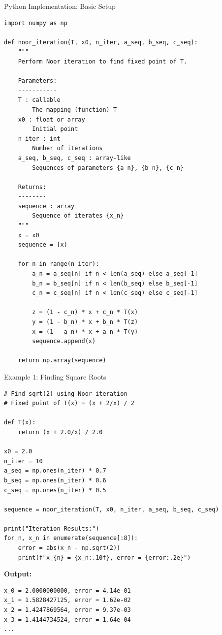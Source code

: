\documentclass[aspectratio=169,10pt]{beamer}
\begin{document}
\begin{frame}[fragile]{Python Implementation: Basic Setup}

\begin{lstlisting}
import numpy as np

def noor_iteration(T, x0, n_iter, a_seq, b_seq, c_seq):
    """
    Perform Noor iteration to find fixed point of T.

    Parameters:
    -----------
    T : callable
        The mapping (function) T
    x0 : float or array
        Initial point
    n_iter : int
        Number of iterations
    a_seq, b_seq, c_seq : array-like
        Sequences of parameters {a_n}, {b_n}, {c_n}

    Returns:
    --------
    sequence : array
        Sequence of iterates {x_n}
    """
    x = x0
    sequence = [x]

    for n in range(n_iter):
        a_n = a_seq[n] if n < len(a_seq) else a_seq[-1]
        b_n = b_seq[n] if n < len(b_seq) else b_seq[-1]
        c_n = c_seq[n] if n < len(c_seq) else c_seq[-1]

        z = (1 - c_n) * x + c_n * T(x)
        y = (1 - b_n) * x + b_n * T(z)
        x = (1 - a_n) * x + a_n * T(y)
        sequence.append(x)

    return np.array(sequence)
\end{lstlisting}

\end{frame}

\begin{frame}[fragile]{Example 1: Finding Square Roots}

\begin{lstlisting}
# Find sqrt(2) using Noor iteration
# Fixed point of T(x) = (x + 2/x) / 2

def T(x):
    return (x + 2.0/x) / 2.0

x0 = 2.0
n_iter = 10
a_seq = np.ones(n_iter) * 0.7
b_seq = np.ones(n_iter) * 0.6
c_seq = np.ones(n_iter) * 0.5

sequence = noor_iteration(T, x0, n_iter, a_seq, b_seq, c_seq)

print("Iteration Results:")
for n, x_n in enumerate(sequence[:8]):
    error = abs(x_n - np.sqrt(2))
    print(f"x_{n} = {x_n:.10f}, error = {error:.2e}")
\end{lstlisting}

\vspace{0.2cm}

\textbf{Output:}
\begin{verbatim}
x_0 = 2.0000000000, error = 4.14e-01
x_1 = 1.5828427125, error = 1.62e-02
x_2 = 1.4247869564, error = 9.37e-03
x_3 = 1.4144734524, error = 1.64e-04
...
\end{verbatim}

\end{frame}
\end{document}
